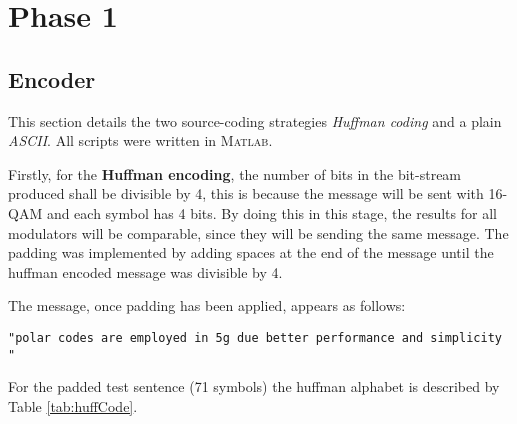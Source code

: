 \section{Phase 1}

\subsection{Encoder}

\label{sec:encoder}

This section details the two source-coding strategies \emph{Huffman coding} and a plain \emph{ASCII}. All scripts were written in \textsc{Matlab}.

\label{ssec:huffman}

Firstly, for the \textbf{Huffman encoding}, the number of bits in the bit-stream produced shall be divisible by 4, this is because the message will be sent with 16-QAM and each symbol has 4 bits. By doing this in this stage, the results for all modulators will be comparable, since they will be sending the same message. The padding was implemented by adding spaces at the end of the message until the huffman encoded message was divisible by 4.

The message, once padding has been applied, appears as follows:

\begin{center}
    \begin{verbatim}
"polar codes are employed in 5g due better performance and simplicity   "
    \end{verbatim}
    
\end{center}

For the padded test sentence (71 symbols) the huffman alphabet is described by Table \ref{tab:huffCode}.

